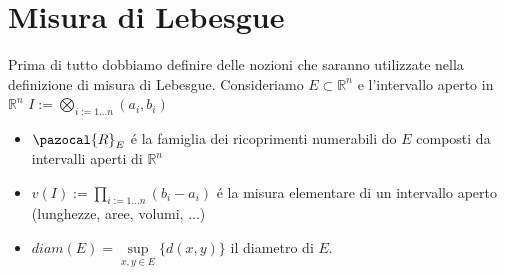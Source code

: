 \documentclass[11pt,a4paper]{report}
\theoremstyle{plain}
\theoremstyle{definition}
\begin{document}
\section{Misura di Lebesgue}
Prima di tutto dobbiamo definire delle nozioni che saranno utilizzate nella definizione di misura di Lebesgue. Consideriamo $E \subset \mathbb{R}^n$ e l'intervallo aperto in $\mathbb{R}^n$ $I := \bigotimes\limits_{i:= 1\ldots n}(a_i,b_i)$
\begin{itemize}
	\item  $\pazocal{R}_E$ \'e la famiglia dei ricoprimenti numerabili do $E$ composti da intervalli aperti di $\mathbb{R}^n$
	\item $v(I) := \prod\limits_{i:= 1\ldots n}(b_i - a_i)$ \'e la misura elementare di un intervallo aperto (lunghezze, aree, volumi, ...)
	\item $diam(E) = \sup\limits_{x,y \in E}\{d(x,y)\}$ il diametro di $E$.
\end{itemize}
\end{document}
